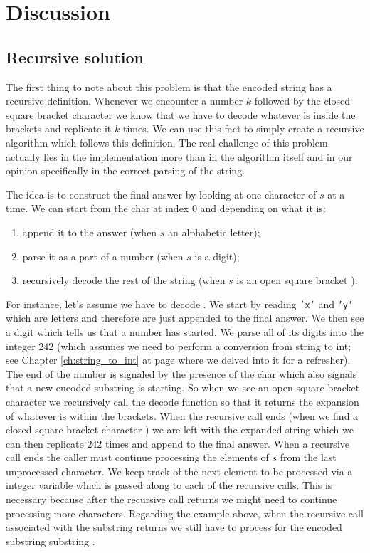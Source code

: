 \section*{Discussion}
\label{decode_string:sec:discussion}


\subsection{Recursive solution}
\label{decode_string:sec:recursive}
The first thing to note about this problem is that the encoded string has a recursive definition.
Whenever we encounter a number $k$ followed by the closed square bracket character  \inline{'['} 
we know that we have
to decode whatever is inside the brackets and replicate it $k$ times.
We can use this fact to simply create a recursive algorithm which follows this definition.
The real challenge of this problem actually lies in the implementation more than in the algorithm itself and in our opinion specifically in the correct parsing of the string.

The idea is to construct the final answer by looking at one character of $s$ at a time. We can start
from  the char at index $0$ and depending on what it is:
\begin{enumerate}
	\item append it to the answer (when $s$ an alphabetic letter);
	\item parse it as a part of a number (when $s$ is a digit);
	\item recursively decode the rest of the string (when $s$ is an open square bracket \inline{'['}).
\end{enumerate}

For instance, let's assume we have to decode .
We start by reading \texttt{'x'} and \texttt{'y'} which are letters and therefore are
just appended to the final answer.
We then see a digit which tells us that a number has started. 
We parse all of its digits into the integer $242$ (which assumes we need to perform a conversion from string to int; see Chapter \ref{ch:string_to_int} at page \pageref{ch:string_to_int} where we delved into it for a refresher).
The end of the number is signaled by the presence of the char
\inline{'['} which also signals that a new encoded substring is starting.
So when we see an open
square bracket character we recursively call the decode function so that it returns the expansion of
whatever is within the brackets.
When the recursive call ends (when we find a closed square bracket
character \inline{']'}) we are left with the expanded string which we can then replicate $242$ times
and append to the final answer.
When a recursive call ends the caller must continue processing the elements of $s$ from the last unprocessed character.
We keep track of the next element to be processed via a integer variable which is passed along to each of the recursive calls.
This is necessary because after the
recursive call returns we might need to continue processing more characters. Regarding the example above, when the recursive call 
associated with the substring  returns we still have to process  for the encoded substring substring 
.

